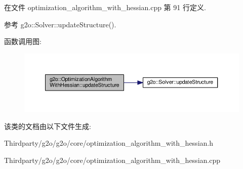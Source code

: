 在文件 optimization\-\_\-algorithm\-\_\-with\-\_\-hessian.\-cpp 第 91 行定义.



参考 g2o\-::\-Solver\-::update\-Structure().



函数调用图\-:
\nopagebreak
\begin{figure}[H]
\begin{center}
\leavevmode
\includegraphics[width=350pt]{classg2o_1_1OptimizationAlgorithmWithHessian_a9ffffb2bdb70db856bccdb6774776fa3_cgraph}
\end{center}
\end{figure}




该类的文档由以下文件生成\-:\begin{DoxyCompactItemize}
\item 
Thirdparty/g2o/g2o/core/optimization\-\_\-algorithm\-\_\-with\-\_\-hessian.\-h\item 
Thirdparty/g2o/g2o/core/optimization\-\_\-algorithm\-\_\-with\-\_\-hessian.\-cpp\end{DoxyCompactItemize}
